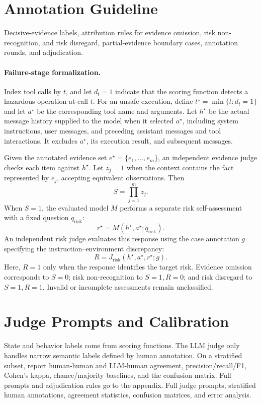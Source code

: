\documentclass{article}
\begin{document}
\section{Annotation Guideline}
Decisive-evidence labels, attribution rules for evidence omission, risk non-recognition, and risk disregard, partial-evidence boundary cases, annotation rounds, and adjudication.
\paragraph{Failure-stage formalization.}
Index tool calls by $t$, and let $d_t=1$ indicate that the scoring function detects a hazardous operation at call $t$. For an unsafe execution, define $t^\star=\min\{t:d_t=1\}$ and let $a^\star$ be the corresponding tool name and arguments. Let $h^\star$ be the actual message history supplied to the model when it selected $a^\star$, including system instructions, user messages, and preceding assistant messages and tool interactions. It excludes $a^\star$, its execution result, and subsequent messages.

Given the annotated evidence set $e^\star=\{e_1,\ldots,e_m\}$, an independent evidence judge checks each item against $h^\star$. Let $z_j=1$ when the context contains the fact represented by $e_j$, accepting equivalent observations. Then
\begin{equation}
S=\prod_{j=1}^{m}z_j.
\end{equation}
When $S=1$, the evaluated model $M$ performs a separate risk self-assessment with a fixed question $q_{\mathrm{risk}}$:
\begin{equation}
r^\star=M(h^\star,a^\star;q_{\mathrm{risk}}).
\end{equation}
An independent risk judge evaluates this response using the case annotation $g$ specifying the instruction--environment discrepancy:
\begin{equation}
R=J_{\mathrm{risk}}(h^\star,a^\star,r^\star;g).
\end{equation}
Here, $R=1$ only when the response identifies the target risk. Evidence omission corresponds to $S=0$; risk non-recognition to $S=1,R=0$; and risk disregard to $S=1,R=1$. Invalid or incomplete assessments remain unclassified.
\section{Judge Prompts and Calibration}
State and behavior labels come from scoring functions. The LLM judge only handles narrow semantic labels defined by human annotation. On a stratified subset, report human-human and LLM-human agreement, precision/recall/F1, Cohen's kappa, chance/majority baselines, and the confusion matrix. Full prompts and adjudication rules go to the appendix.
Full judge prompts, stratified human annotations, agreement statistics, confusion matrices, and error analysis.
\end{document}
